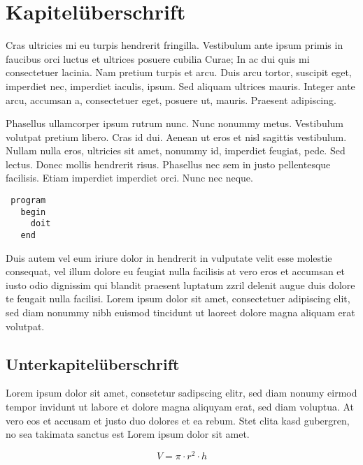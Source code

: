 \documentclass{akdw}
\begin{document}
\section{Kapitelüberschrift}

Cras ultricies mi eu turpis hendrerit fringilla. Vestibulum ante ipsum primis in faucibus orci 
luctus et ultrices posuere cubilia Curae; In ac dui quis mi consectetuer lacinia. Nam pretium 
turpis 
et arcu. Duis arcu tortor, suscipit eget, imperdiet nec, imperdiet iaculis, ipsum. Sed aliquam 
ultrices mauris. Integer ante arcu, accumsan a, consectetuer eget, posuere ut, mauris. Praesent 
adipiscing.

Phasellus ullamcorper ipsum rutrum nunc. Nunc nonummy metus. Vestibulum volutpat pretium libero. 
Cras id dui. Aenean ut eros et nisl sagittis vestibulum. Nullam nulla eros, ultricies sit amet, 
nonummy id, imperdiet feugiat, pede. Sed lectus. Donec mollis hendrerit risus. Phasellus nec sem in 
justo pellentesque facilisis. Etiam imperdiet imperdiet orci. Nunc nec neque.
 

\begin{verbatim}
 program
   begin
     doit
   end
\end{verbatim}

Duis \cite{Gl09} autem vel eum iriure dolor in hendrerit in vulputate velit esse molestie consequat, vel illum 
dolore eu feugiat nulla facilisis at vero eros et accumsan et iusto odio dignissim qui blandit 
praesent luptatum zzril delenit augue duis dolore te feugait nulla facilisi. Lorem ipsum dolor sit 
amet, consectetuer \cite[S. 333]{Wa14} adipiscing elit, sed diam nonummy \cite[S. 4-7]{Wa14b} nibh euismod tincidunt ut laoreet dolore magna 
aliquam erat volutpat. 


\subsection{Unterkapitelüberschrift}

Lorem ipsum dolor sit amet, consetetur sadipscing \cite{AB00} elitr, sed diam nonumy eirmod tempor invidunt ut 
labore et dolore magna aliquyam erat, sed diam voluptua. At vero eos et accusam et justo duo dolores 
et ea rebum. Stet clita kasd gubergren, no sea takimata sanctus est Lorem ipsum dolor sit amet. 
  

\begin{equation}
V= \pi \cdot r^{2} \cdot h
\end{equation}
\end{document}
